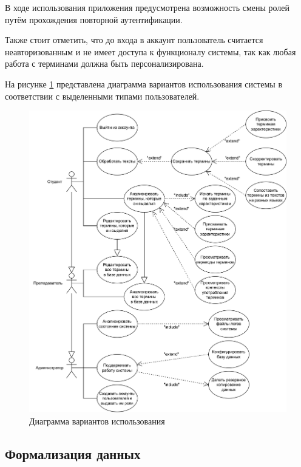 В ходе использования приложения предусмотрена возможность смены ролей путём прохождения повторной аутентификации.

Также стоит отметить, что до входа в аккаунт пользователь считается неавторизованным и не имеет доступа к функционалу системы, так как любая работа с терминами должна быть персонализирована.

На рисунке \ref{fig:use-case} представлена диаграмма вариантов использования системы в соответствии с выделенными типами пользователей.

\begin{figure}[h]
	\centering
	\includegraphics[width=\textwidth ]{img/Use-case/Use-case.drawio.png}
	\caption{Диаграмма вариантов использования}
	\label{fig:use-case}
\end{figure} 

\clearpage



\subsection{Формализация данных}

